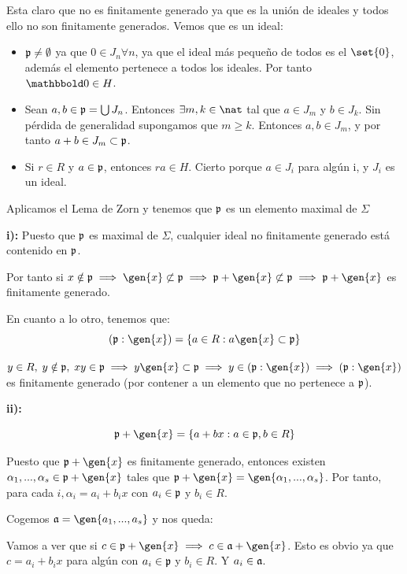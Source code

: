 \begin{problem}[1]
	Esta claro que no es finitamente generado ya que es la unión de ideales y todos ello no son finitamente generados. Vemos que es un ideal:
	\begin{itemize}
		\item $\mathfrak{p} \neq \emptyset$ ya que $0 \in J_n \forall n$, ya que el ideal más pequeño de todos es el $\set{0}$, además el elemento \zero pertenece a todos los ideales. Por tanto $\zero \in H$.
		\item Sean $a,b \in \mathfrak{p}=\bigcup J_n$.  Entonces $\exists m,k \in \nat$ tal que $a \in J_m$ y $b \in J_k$. Sin pérdida de generalidad supongamos que $m \geq k$. Entonces $a,b \in J_m$, y por tanto $a+b \in J_m \subset \mathfrak{p}$.
		\item Si $r\in R$ y $a \in \mathfrak{p}$, entonces $ra \in H$. Cierto porque $a \in J_i$ para algún i, y $J_i$ es un ideal.
	\end{itemize}

	Aplicamos el Lema de Zorn y tenemos que $\mathfrak{p}$ es un elemento maximal de $\Sigma$

	\spart

	\textbf{i):} Puesto que $\mathfrak{p}$ es maximal de $\Sigma$, cualquier ideal no finitamente generado está contenido en $\mathfrak{p}$.

	Por tanto si $x \notin \pideal \implies \gen{x} \not\subset \pideal \implies \pideal+\gen{x}  \not\subset \pideal \implies \pideal+\gen{x}$ es finitamente generado.

	En cuanto a lo otro, tenemos que:
	$$(\pideal:\gen{x})=\{a \in R : a\gen{x} \subset \pideal \}$$

	$y \in R, \; y \notin \pideal, \; xy \in \pideal \implies y\gen{x} \subset \pideal \implies y \in (\pideal:\gen{x}) \implies (\pideal:\gen{x})$ es finitamente generado (por contener a un elemento que no pertenece a $\mathfrak{p}$).

	\textbf{ii):}

	$$\pideal + \gen{x} = \{ a + bx: a \in \pideal, b \in R \} $$

	Puesto que $\pideal + \gen{x}$ es finitamente generado, entonces existen $\alpha_1,...,\alpha_s \in \pideal + \gen{x}$ tales que $\pideal + \gen{x} = \gen{\alpha_1,...,\alpha_s}$. Por tanto, para cada $i, \alpha_i=a_i +b_ix$ con $a_i \in \mathfrak{p}$ y $b_i \in R$.

	Cogemos $\aideal = \gen{a_1,...,a_s}$ y nos queda:

	Vamos a ver que si $c \in \pideal + \gen{x} \implies c \in \aideal + \gen{x}$. Esto es obvio ya que $c = a_i+b_ix$ para algún con $a_i \in \mathfrak{p}$ y $b_i \in R$. Y $a_i \in \mathfrak{a}$.


\end{problem}
